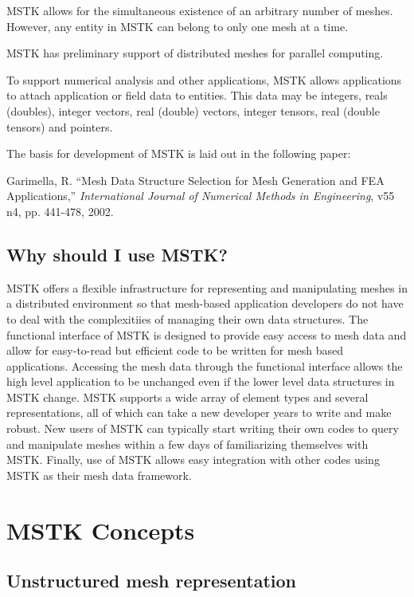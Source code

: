 \documentclass[12pt]{article}
\begin{document}
\par MSTK allows for the simultaneous existence of an arbitrary number of
meshes. However, any entity in MSTK can belong to only one mesh at a
time.

\par MSTK has preliminary support of distributed meshes for parallel
computing. 

\par To support numerical analysis and other applications, MSTK allows
applications to attach application or field data to entities. This
data may be integers, reals (doubles), integer vectors, real (double)
vectors, integer tensors, real (double tensors) and pointers.

\par The basis for development of MSTK is laid out in the following paper:

Garimella, R. ``Mesh Data Structure Selection for Mesh Generation and
FEA Applications,'' {\em International Journal of Numerical Methods
  in Engineering}, v55 n4, pp. 441-478, 2002.


\subsection{Why should I use MSTK?}

MSTK offers a flexible infrastructure for representing and
manipulating meshes in a distributed environment so that mesh-based
application developers do not have to deal with the complexitiies of
managing their own data structures. The functional interface of MSTK
is designed to provide easy access to mesh data and allow for
easy-to-read but efficient code to be written for mesh based
applications. Accessing the mesh data through the functional interface
allows the high level application to be unchanged even if the lower
level data structures in MSTK change. MSTK supports a wide array of
element types and several representations, all of which can take a new
developer years to write and make robust. New users of MSTK can
typically start writing their own codes to query and manipulate meshes
within a few days of familiarizing themselves with MSTK. Finally, use
of MSTK allows easy integration with other codes using MSTK as their
mesh data framework.


\section{MSTK Concepts}
\subsection{Unstructured mesh representation}
\end{document}
